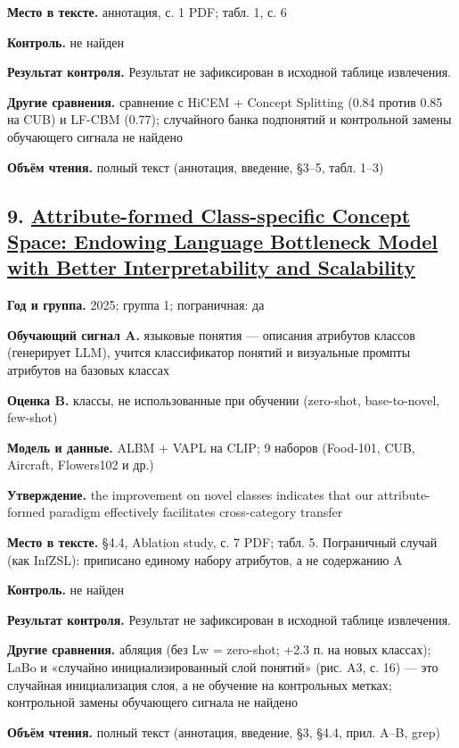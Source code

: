 \textbf{Место в тексте.} аннотация, с. 1 PDF; табл. 1, с. 6

\textbf{Контроль.} не найден

\textbf{Результат контроля.} Результат не зафиксирован в исходной таблице извлечения.

\textbf{Другие сравнения.} сравнение с HiCEM + Concept Splitting (0.84 против 0.85 на CUB) и LF-CBM (0.77); случайного банка подпонятий и контрольной замены обучающего сигнала не найдено

\textbf{Объём чтения.} полный текст (аннотация, введение, §3–5, табл. 1–3)


\subsection*{9. \href{https://doi.org/10.1109/cvpr52734.2025.02820}{Attribute-formed Class-specific Concept Space: Endowing Language Bottleneck Model with Better Interpretability and Scalability}}

\textbf{Год и группа.} 2025; группа 1; пограничная: да

\textbf{Обучающий сигнал A.} языковые понятия — описания атрибутов классов (генерирует LLM), учится классификатор понятий и визуальные промпты атрибутов на базовых классах

\textbf{Оценка B.} классы, не использованные при обучении (zero-shot, base-to-novel, few-shot)

\textbf{Модель и данные.} ALBM + VAPL на CLIP; 9 наборов (Food-101, CUB, Aircraft, Flowers102 и др.)

\textbf{Утверждение.} the improvement on novel classes indicates that our attribute-formed paradigm effectively facilitates cross-category transfer

\textbf{Место в тексте.} §4.4, Ablation study, с. 7 PDF; табл. 5. Пограничный случай (как InfZSL): приписано единому набору атрибутов, а не содержанию A

\textbf{Контроль.} не найден

\textbf{Результат контроля.} Результат не зафиксирован в исходной таблице извлечения.

\textbf{Другие сравнения.} абляция (без Lw = zero-shot; +2.3 п. на новых классах); LaBo и «случайно инициализированный слой понятий» (рис. A3, с. 16) — это случайная инициализация слоя, а не обучение на контрольных метках; контрольной замены обучающего сигнала не найдено

\textbf{Объём чтения.} полный текст (аннотация, введение, §3, §4.4, прил. A–B, grep)


